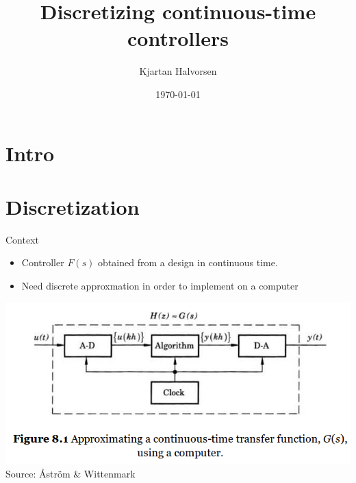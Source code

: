\documentclass[presentation,aspectratio=1610]{beamer}
\author{Kjartan Halvorsen}
\date{\today}
\title{Discretizing continuous-time controllers}
\begin{document}
\maketitle


\section{Intro}
\label{sec:orga8428f5}

\section{Discretization}
\label{sec:org7360ea5}
\begin{frame}[label={sec:orgfd75bc5}]{Context}
\begin{itemize}
\item Controller \(F(s)\) obtained from a design in continuous time.
\end{itemize}
\pause
\begin{itemize}
\item Need discrete approxmation in order to implement on a computer
\end{itemize}

\begin{center}
 \includegraphics[width=0.7\linewidth]{../../figures/fig8-1.png}\\
 \footnotesize Source: Åström \& Wittenmark 
\end{center}
\end{frame}
\end{document}
